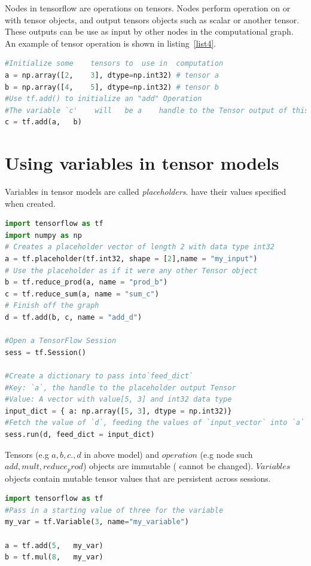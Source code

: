 \documentclass[vecarrow]{svproc}
\begin{document}
Nodes in tensorflow are operations on tensors. Nodes perform operation on or with tensor objects, and output tensors objects such as scalar or another tensor. These outputs can be use as input by other nodes in the computational graph. An example of tensor operation is shown in listing~\ref{list4}.

\begin{lstlisting}[language=Python,
caption={operations on tensors},label={list4}]
#Initialize	some	tensors	to	use	in	computation
a = np.array([2,	3],	dtype=np.int32) # tensor a
b =	np.array([4,	5],	dtype=np.int32) # tensor b
#Use tf.add() to initialize an "add" Operation
#The variable `c'	 will	be a	handle to the Tensor output of this	Op
c = tf.add(a,	b)
\end{lstlisting}

\section{Using variables in tensor models}

Variables in tensor models are called \textit{placeholders}. have their values specified when created.

\begin{lstlisting}[language=Python,
caption={use placeholders in tensor},label={list5}]
import tensorflow as tf
import numpy as np
# Creates a placeholder vector of length 2 with data type int32
a = tf.placeholder(tf.int32, shape = [2],name = "my_input")
# Use the placeholder as if it were any other Tensor object
b = tf.reduce_prod(a, name = "prod_b")
c = tf.reduce_sum(a, name = "sum_c")
# Finish off the graph
d = tf.add(b, c, name = "add_d")

#Open a TensorFlow Session
sess = tf.Session()

#Create a dictionary to pass into`feed_dict`
#Key: `a`, the handle to the placeholder output Tensor
#Value: A vector with value[5, 3] and int32 data type
input_dict = { a: np.array([5, 3], dtype = np.int32)}
#Fetch the value of `d`, feeding the values of `input_vector` into `a`
sess.run(d, feed_dict = input_dict)
\end{lstlisting}

Tensors (e.g $a, b , c., d$ in above model)  and $operation$ (e.g node such
$add, mult, reduce_prod$)
objects are immutable ( cannot be changed). $Variables$ objects contain
mutable tensor values that are persistent across sessions.

\begin{lstlisting}[language=Python,
caption={use placeholders in tensor},label={list6}]
import tensorflow as tf
#Pass in a starting value of three for the variable
my_var = tf.Variable(3, name="my_variable")

a = tf.add(5,	my_var)
b =	tf.mul(8,	my_var)
\end{lstlisting}
\end{document}

